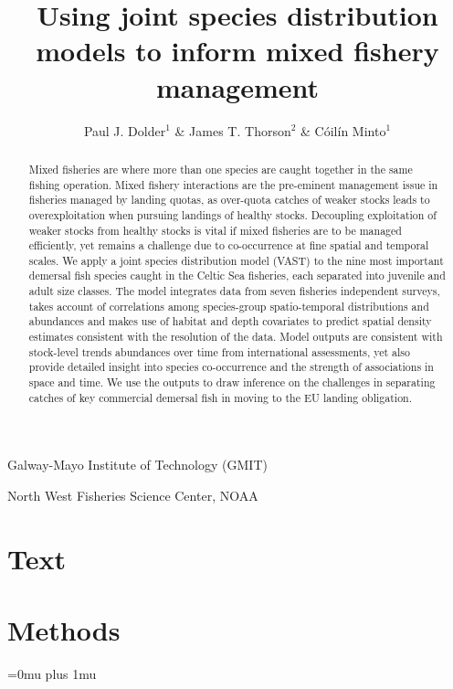 \documentclass{nature}
\title{Using joint species distribution models to inform mixed fishery
management}
\author{Paul J. Dolder$^1$ \& James T. Thorson$^2$ \& Cóilín Minto$^1$}
\begin{document}
\maketitle

\begin{affiliations}
\item Galway-Mayo Institute of Technology (GMIT) 
\item North West Fisheries Science Center, NOAA
\end{affiliations}

\begin{linenumbers}

\begin{abstract}
Mixed fisheries are where more than one species are caught together in the same
fishing operation. Mixed fishery interactions are the pre-eminent management
issue in fisheries managed by landing quotas, as over-quota catches of weaker
stocks leads to overexploitation when pursuing landings of healthy stocks.
Decoupling exploitation of weaker stocks from healthy stocks is vital if mixed
fisheries are to be managed efficiently, yet remains a challenge due to
co-occurrence at fine spatial and temporal scales. We apply a joint species
distribution model (VAST) to the nine most important demersal fish species
caught in the Celtic Sea fisheries, each separated into juvenile and adult size
classes. The model integrates data from seven fisheries independent surveys,
takes account of correlations among species-group spatio-temporal distributions
and abundances and makes use of habitat and depth covariates to predict spatial
density estimates consistent with the resolution of the data. Model outputs are
consistent with stock-level trends abundances over time from international
assessments, yet also provide detailed insight into species co-occurrence and
the strength of associations in space and time. We use the outputs to draw
inference on the challenges in separating catches of key commercial demersal
fish in moving to the EU landing obligation.
\end{abstract}

\section*{Text}



\section*{Methods}

\end{linenumbers}
\newpage
\Urlmuskip=0mu plus 1mu\relax
%
\end{document}
